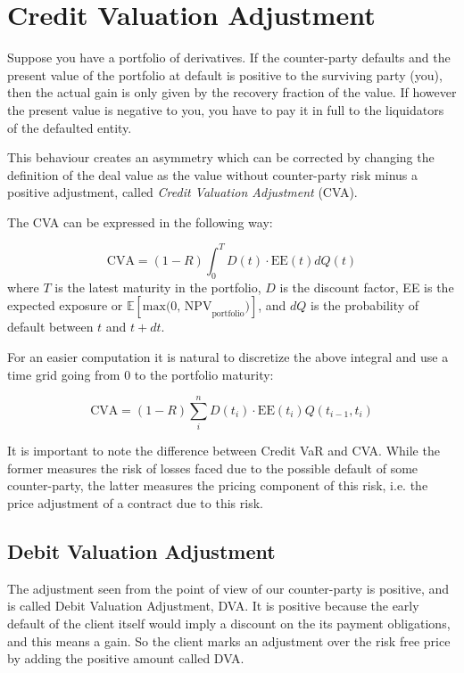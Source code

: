 \section{Credit Valuation Adjustment}
\label{credit-valuation-adjustment}

Suppose you have a portfolio of derivatives. If the counter-party defaults and the present value of the portfolio at default is positive to the surviving party (you), then the actual gain is only given by the recovery fraction of the value. If however the present value is negative to you, you have to pay it in full to the liquidators of the defaulted entity.

This behaviour creates an asymmetry which can be corrected by changing the definition of the deal value as the value without counter-party risk minus a positive adjustment, called \emph{Credit Valuation Adjustment} (CVA).

The CVA can be expressed in the following way:

\begin{equation}
\text{CVA} = (1-R) \int_0^T D(t) \cdot \textrm{EE}(t) dQ(t)
\label{eq:cva}
\end{equation}
where $T$ is the latest maturity in the portfolio, $D$ is the discount factor, EE is the expected exposure or \(\mathbb{E}[\text{max(0, NPV}_\text{portfolio})]\), and $dQ$ is the probability of default between $t$ and $t+dt$.

For an easier computation it is natural to discretize the above integral and use a time grid going from 0 to the portfolio maturity:

\begin{equation}
\text{CVA} = (1-R) \sum_i^n D(t_i) \cdot \mathrm{EE}(t_i) Q(t_{i-1}, t_i)
\label{eq:cva_discrete}
\end{equation}

It is important to note the difference between Credit VaR and CVA. While the former measures the risk of losses faced due to the possible default of some counter-party, the latter measures the pricing component of this risk, i.e. the price adjustment of a contract due to this risk.

\subsection{Debit Valuation Adjustment}

The adjustment seen from the point of view of our counter-party is positive, and is called Debit Valuation Adjustment, DVA. It is positive because the early default of the client itself would imply a discount on the its payment obligations, and this means a gain. So the client marks an adjustment over the risk free price by adding the positive amount called DVA. 

